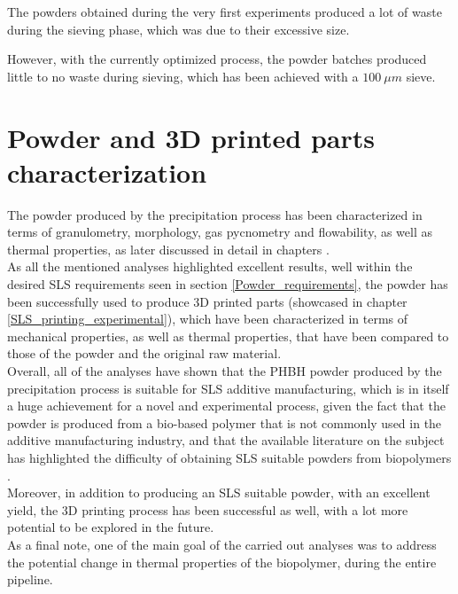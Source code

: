 \documentclass{article}
\begin{document}
    The powders obtained during the very first experiments produced a lot of waste during the sieving phase, which was due to their excessive size. 

    However, with the currently optimized process, the powder batches produced little to no waste during sieving, which has been achieved 
    with a $100 \ \mu m$ sieve. \\

    \clearpage

    \section{Powder and 3D printed parts characterization\label{powder_characterization}}

    The powder produced by the precipitation process has been characterized in terms of granulometry, morphology, gas pycnometry and flowability, 
    as well as thermal properties, as later discussed in detail in chapters  . \\

    As all the mentioned analyses highlighted excellent results, well within the desired SLS requirements seen in section \ref{Powder_requirements}, the powder has been successfully used to produce 3D printed parts
    (showcased in chapter \ref{SLS_printing_experimental}), which have been characterized in terms of mechanical properties, as well as thermal properties, that have been 
    compared to those of the powder and the original raw material. \\

    Overall, all of the analyses have shown that the PHBH powder produced by the precipitation process is suitable for SLS additive manufacturing, which is in itself a huge achievement for a 
    novel and experimental process, given the fact that the powder is produced from a bio-based polymer that is not commonly used in the additive manufacturing industry, and that 
    the available literature on the subject has highlighted the difficulty of obtaining SLS suitable powders from biopolymers \autocites{Padovano_SLS_Review}. \\ 

    Moreover, in addition to producing an SLS suitable powder, with an excellent yield, the 3D printing process has been successful as well, with 
    a lot more potential to be explored in the future. \\ 

    As a final note, one of the main goal of the carried out analyses was to address the potential change in thermal properties of the biopolymer, during the entire pipeline. 
    
\end{document}
